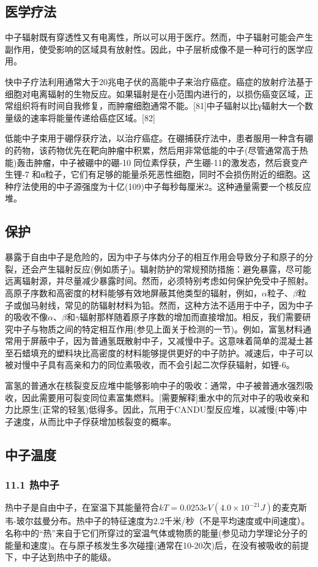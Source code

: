 \subsection{医学疗法}
中子辐射既有穿透性又有电离性，所以可以用于医疗。然而，中子辐射可能会产生副作用，使受影响的区域具有放射性。因此，中子层析成像不是一种可行的医学应用。

快中子疗法利用通常大于20兆电子伏的高能中子来治疗癌症。癌症的放射疗法基于细胞对电离辐射的生物反应。如果辐射是在小范围内进行的，以损伤癌变区域，正常组织将有时间自我修复，而肿瘤细胞通常不能。[81]中子辐射以比γ辐射大一个数量级的速率将能量传递给癌症区域。[82]

低能中子束用于硼俘获疗法，以治疗癌症。在硼捕获疗法中，患者服用一种含有硼的药物，该药物优先在靶向肿瘤中积累，然后用非常低能的中子(尽管通常高于热能)轰击肿瘤，中子被硼中的硼-10 同位素俘获，产生硼-11的激发态，然后衰变产生锂-7 和α粒子，它们有足够的能量杀死恶性细胞，同时不会损伤附近的细胞。这种疗法使用的中子源强度为十亿(109)中子每秒每厘米2。这种通量需要一个核反应堆。

\subsection{保护}
暴露于自由中子是危险的，因为中子与体内分子的相互作用会导致分子和原子的分裂，还会产生辐射反应(例如质子)。辐射防护的常规预防措施：避免暴露，尽可能远离辐射源，并尽量减少暴露时间。然而，必须特别考虑如何保护免受中子照射。高原子序数和高密度的材料能够有效地屏蔽其他类型的辐射，例如，$\alpha$粒子、$\beta$粒子或伽马射线，常见的防辐射材料为铅。然而，这种方法不适用于中子，因为中子的吸收不像$\alpha$、$\beta$和$\gamma$辐射那样随着原子序数的增加而直接增加。相反，我们需要研究中子与物质之间的特定相互作用(参见上面关于检测的一节)。例如，富氢材料通常用于屏蔽中子，因为普通氢既散射中子，又减慢中子。这意味着简单的混凝土甚至石蜡填充的塑料块比高密度的材料能够提供更好的中子防护。减速后，中子可以被对慢中子具有高亲和力的同位素吸收，而不会引起二次俘获辐射，如锂-6。

富氢的普通水在核裂变反应堆中能够影响中子的吸收：通常，中子被普通水强烈吸收，因此需要用可裂变同位素富集燃料。[需要解释]重水中的氘对中子的吸收亲和力比原生(正常的轻氢)低得多。因此，氘用于CANDU型反应堆，以减慢(中等)中子速度，从而比中子俘获增加核裂变的概率。

\subsection{中子温度}
\subsubsection{11.1 热中子}
热中子是自由中子，在室温下其能量符合$kT=0.0253 eV(4.0\times10^{-21} J)$的麦克斯韦-玻尔兹曼分布。热中子的特征速度为2.2千米/秒（不是平均速度或中间速度）。名称中的“热”来自于它们所穿过的室温气体或物质的能量(参见动力学理论分子的能量和速度)。在与原子核发生多次碰撞(通常在10-20次)后，在没有被吸收的前提下，中子达到热中子的能级。

